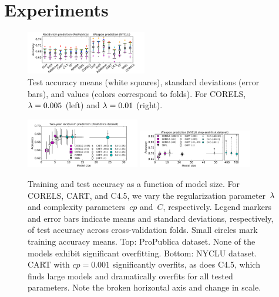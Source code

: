 \section{Experiments}
\label{sec:experiments}

\begin{figure}[t!]
\begin{center}
\includegraphics[trim={8mm, 10mm, 15mm, 5mm},
width=0.47\textwidth]{figs/compare-compas-weapon.pdf}
\end{center}
\caption{Test accuracy means (white squares),
standard deviations (error bars),
and values (colors correspond to folds).
For CORELS, ${{\lambda} = 0.005}$ (left) and ${{\lambda} = 0.01}$ (right).
}
\label{fig:comparison}
\end{figure}

\begin{figure}[t!]
\begin{center}
\includegraphics[trim={12mm, 7mm, 24mm, 10mm}, width=0.44\textwidth]{figs/compas-sparsity-training.pdf}
\includegraphics[trim={15mm, 12mm, 24mm, 1mm}, width=0.44\textwidth]{figs/frisk-sparsity-training-c45.pdf}
\end{center}
\caption{Training and test accuracy as a function of model size.
%
For CORELS, CART, and C4.5, we vary the regularization parameter~${\lambda}$
and complexity parameters~$cp$ and~$C$, respectively.
%
Legend markers and error bars indicate means and standard deviations,
respectively, of test accuracy across cross-validation folds.
%
Small circles mark training accuracy means.
%
Top:  %
ProPublica dataset.
%
None of the models exhibit significant overfitting.
%
Bottom:  %
NYCLU dataset.
%
%
CART with ${cp = 0.001}$ significantly overfits, as does C4.5,
which finds large models and dramatically overfits for all tested parameters.
%
Note the broken horizontal axis and change in scale.
}
\label{fig:sparsity}
\end{figure}

